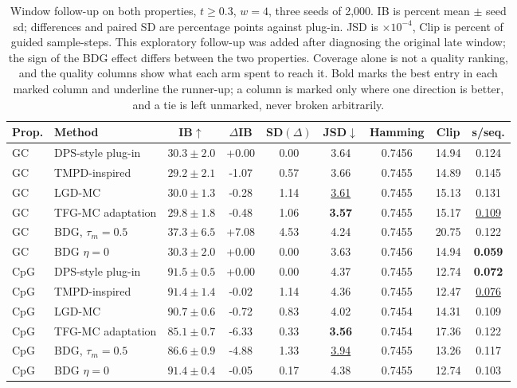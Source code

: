 \documentclass{article}
\begin{document}
\begin{table}[!htbp]
\centering\small
\caption{Window follow-up on both properties, $t\ge0.3$, $w=4$, three seeds of 2,000. IB is percent mean $\pm$ seed sd; differences and paired SD are percentage points against plug-in. JSD is $\times10^{-4}$, Clip is percent of guided sample-steps. This exploratory follow-up was added after diagnosing the original late window; the sign of the BDG effect differs between the two properties. Coverage alone is not a quality ranking, and the quality columns show what each arm spent to reach it. Bold marks the best entry in each marked column and underline the runner-up; a column is marked only where one direction is better, and a tie is left unmarked, never broken arbitrarily.}
\label{tab:m2-window}
\begin{tabular}{llccccccc}
\toprule
Prop. & Method & IB$\uparrow$ & $\Delta$IB & SD$(\Delta)$ & JSD$\downarrow$ & Hamming & Clip & s/seq.\\
\midrule
GC & DPS-style plug-in & $30.3\pm2.0$ & +0.00 & 0.00 & 3.64 & 0.7456 & 14.94 & 0.124\\
GC & TMPD-inspired & $29.2\pm2.1$ & -1.07 & 0.57 & 3.66 & 0.7455 & 14.89 & 0.145\\
GC & LGD-MC & $30.0\pm1.3$ & -0.28 & 1.14 & \underline{3.61}& 0.7455 & 15.13 & 0.131\\
GC & TFG-MC adaptation & $29.8\pm1.8$ & -0.48 & 1.06 & \textbf{3.57}& 0.7455 & 15.17 & \underline{0.109}\\
GC & BDG, $\tau_m=0.5$ & $\mathbf{37.3\pm6.5}$& +7.08 & 4.53 & 4.24 & 0.7455 & 20.75 & 0.122\\
GC & BDG $\eta=0$ & $30.3\pm2.0$ & +0.00 & 0.00 & 3.63 & 0.7456 & 14.94 & \textbf{0.059}\\
\midrule
CpG & DPS-style plug-in & $\mathbf{91.5\pm0.5}$& +0.00 & 0.00 & 4.37 & 0.7455 & 12.74 & \textbf{0.072}\\
CpG & TMPD-inspired & $91.4\pm1.4$ & -0.02 & 1.14 & 4.36 & 0.7455 & 12.47 & \underline{0.076}\\
CpG & LGD-MC & $90.7\pm0.6$ & -0.72 & 0.83 & 4.02 & 0.7454 & 14.31 & 0.109\\
CpG & TFG-MC adaptation & $85.1\pm0.7$ & -6.33 & 0.33 & \textbf{3.56}& 0.7454 & 17.36 & 0.122\\
CpG & BDG, $\tau_m=0.5$ & $86.6\pm0.9$ & -4.88 & 1.33 & \underline{3.94}& 0.7455 & 13.26 & 0.117\\
CpG & BDG $\eta=0$ & $91.4\pm0.4$ & -0.05 & 0.17 & 4.38 & 0.7455 & 12.74 & 0.103\\
\bottomrule
\end{tabular}
\end{table}
\end{document}
